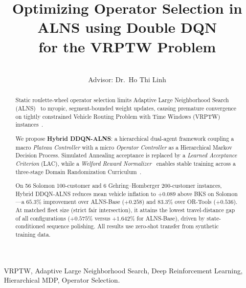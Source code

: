 \documentclass[conference]{IEEEtran}
\begin{document}
\title{Optimizing Operator Selection in ALNS using Double DQN\\
       for the VRPTW Problem}

\author{%
  \\\small{Advisor: Dr.~Ho Thi Linh}}
\maketitle

\begin{abstract}
Static roulette-wheel operator selection limits Adaptive Large Neighborhood Search
(ALNS)~\cite{Ropke2006} to myopic, segment-bounded weight updates, causing
premature convergence on tightly constrained Vehicle Routing Problem with
Time Windows (VRPTW) instances~\cite{Dantzig1959}.

We propose \textbf{Hybrid DDQN-ALNS}: a hierarchical dual-agent framework
coupling a macro \emph{Plateau Controller} with a micro
\emph{Operator Controller} as a Hierarchical Markov Decision Process.  Simulated
Annealing acceptance is replaced by a \emph{Learned Acceptance Criterion} (LAC),
while a \emph{Welford Reward Normalizer}~\cite{welford1962} enables stable
training across a three-stage Domain Randomization Curriculum~\cite{tobin2017domain}.

On 56 Solomon 100-customer and 6 Gehring--Homberger 200-customer instances,
Hybrid DDQN-ALNS reduces mean vehicle inflation to $+0.089$ above BKS on Solomon---a
$\mathbf{65.3\%}$ improvement over ALNS-Base ($+0.258$) and $\mathbf{83.3\%}$ over
OR-Tools ($+0.536$).  At matched fleet size (strict fair intersection), it attains the
lowest travel-distance gap of all configurations ($\mathbf{+0.575\%}$ versus $+1.642\%$
for ALNS-Base), driven by state-conditioned sequence polishing.  All results use
zero-shot transfer from synthetic training data.
\end{abstract}

\begin{IEEEkeywords}
VRPTW, Adaptive Large Neighborhood Search, Deep Reinforcement Learning,
Hierarchical MDP, Operator Selection.
\end{IEEEkeywords}
\end{document}
